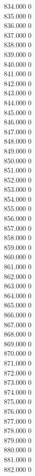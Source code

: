 { 834.000	0 \\
 835.000	0 \\
 836.000	0 \\
 837.000	0 \\
 838.000	0 \\
 839.000	0 \\
 840.000	0 \\
 841.000	0 \\
 842.000	0 \\
 843.000	0 \\
 844.000	0 \\
 845.000	0 \\
 846.000	0 \\
 847.000	0 \\
 848.000	0 \\
 849.000	0 \\
 850.000	0 \\
 851.000	0 \\
 852.000	0 \\
 853.000	0 \\
 854.000	0 \\
 855.000	0 \\
 856.000	0 \\
 857.000	0 \\
 858.000	0 \\
 859.000	0 \\
 860.000	0 \\
 861.000	0 \\
 862.000	0 \\
 863.000	0 \\
 864.000	0 \\
 865.000	0 \\
 866.000	0 \\
 867.000	0 \\
 868.000	0 \\
 869.000	0 \\
 870.000	0 \\
 871.000	0 \\
 872.000	0 \\
 873.000	0 \\
 874.000	0 \\
 875.000	0 \\
 876.000	0 \\
 877.000	0 \\
 878.000	0 \\
 879.000	0 \\
 880.000	0 \\
 881.000	0 \\
 882.000	0 \\
}
